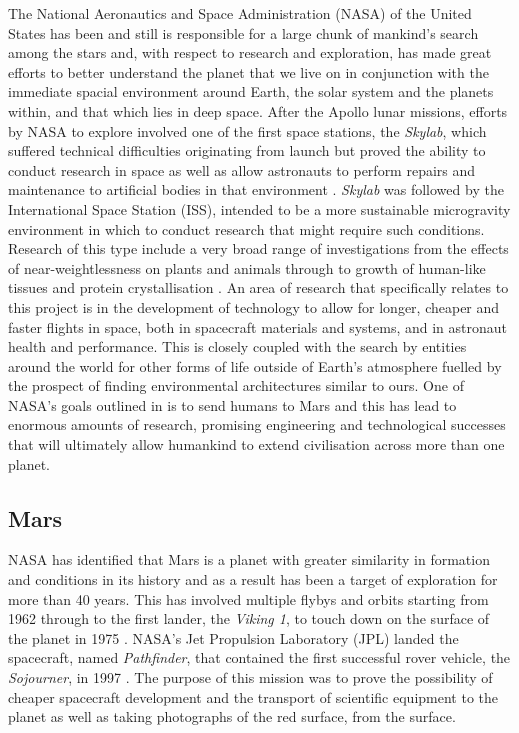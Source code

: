       The National Aeronautics and Space Administration (NASA) of the United States has been and still is responsible for a large chunk of mankind's search among the stars and, with respect to research and exploration, has made great efforts to better understand the planet that we live on in conjunction with the immediate spacial environment around Earth, the solar system and the planets within, and that which lies in deep space. After the Apollo lunar missions, efforts by NASA to explore involved one of the first space stations, the \textit{Skylab}, which suffered technical difficulties originating from launch but proved the ability to conduct research in space as well as allow astronauts to perform repairs and maintenance to artificial bodies in that environment \cite{compton1983living}. \textit{Skylab} was followed by the International Space Station (ISS), intended to be a more sustainable microgravity environment in which to conduct research that might require such conditions. Research of this type include a very broad range of investigations from the effects of near-weightlessness on plants and animals through to growth of human-like tissues and protein crystallisation \cite{nasaresearch}. An area of research that specifically relates to this project is in the development of technology to allow for longer, cheaper and faster flights in space, both in spacecraft materials and systems, and in astronaut health and performance. This is closely coupled with the search by entities around the world for other forms of life outside of Earth's atmosphere fuelled by the prospect of finding environmental architectures similar to ours. One of NASA's goals outlined in \cite{nasa2010act} is to send humans to Mars and this has lead to enormous amounts of research, promising engineering and technological successes that will ultimately allow humankind to extend civilisation across more than one planet.
    
    \subsection{Mars} 
      NASA has identified that Mars is a planet with greater similarity in formation and conditions in its history and as a result has been a target of exploration for more than 40 years. This has involved multiple flybys and orbits starting from 1962 through to the first lander, the \textit{Viking 1}, to touch down on the surface of the planet in 1975 \cite{marsprogram2008}. NASA's Jet Propulsion Laboratory (JPL) landed the spacecraft, named \textit{Pathfinder}, that contained the first successful rover vehicle, the \textit{Sojourner}, in 1997 \cite{pathfindersojournerjpl}. The purpose of this mission was to prove the possibility of cheaper spacecraft development and the transport of scientific equipment to the planet as well as taking photographs of the red surface, from the surface. 
    
